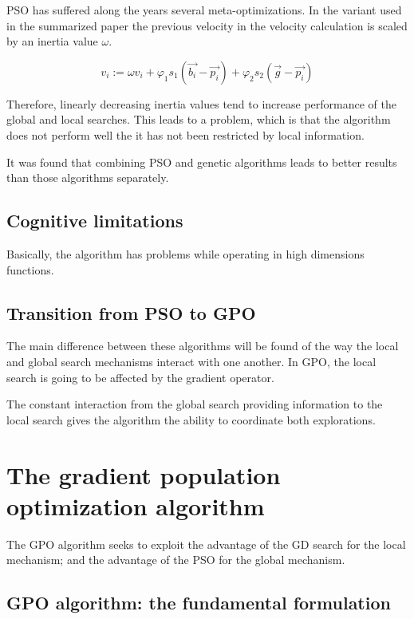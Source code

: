 \documentclass[10pt]{article}
\begin{document}
PSO has suffered along the years several meta-optimizations. In the variant used
in the summarized paper the previous velocity in the velocity calculation is
scaled by an inertia value $\omega$.

\begin{equation}
v_i := \omega v_i + \varphi_1 s_1(\vec{b_i} - \vec{p_i}) 
    + \varphi_2 s_2(\vec{g} - \vec{p_i})
\end{equation}

Therefore, linearly decreasing inertia values tend to increase performance of
the global and local searches. This leads to a problem, which is that the 
algorithm does not perform well the it has not been restricted by local 
information.

It was found that combining PSO and genetic algorithms leads to better results
than those algorithms separately.

\subsection{Cognitive limitations}

Basically, the algorithm has problems while operating in high dimensions
functions.

\subsection{Transition from PSO to GPO}

The main difference between these algorithms will be found of the way the local
and global search mechanisms interact with one another. In GPO, the local search
is going to be affected by the gradient operator. 

The constant interaction from the global search providing information to the
local search gives the algorithm the ability to coordinate both explorations.

\section{The gradient population optimization algorithm}

The GPO algorithm seeks to exploit the advantage of the GD search for the local
mechanism; and the advantage of the PSO for the global mechanism.

\subsection{GPO algorithm: the fundamental formulation}
\end{document}
